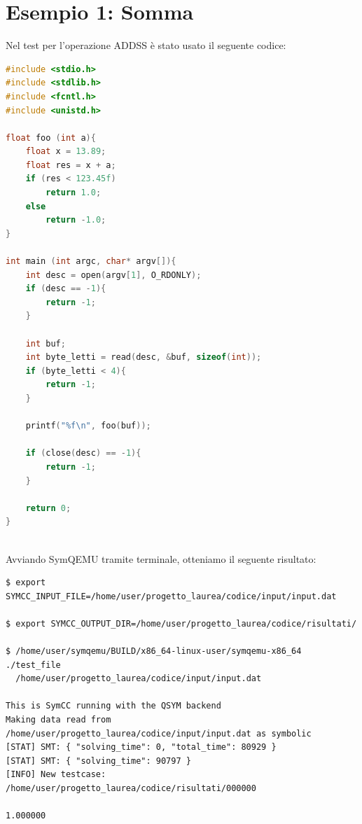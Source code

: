 \documentclass[Lau, oneside]{sapthesis}%
\begin{document}
\section{Esempio 1: Somma}
Nel test per l'operazione ADDSS è stato usato il seguente codice:
\newline
\begin{lstlisting}[xleftmargin=0\textwidth, language=C, basicstyle=\small]
#include <stdio.h>
#include <stdlib.h>
#include <fcntl.h>
#include <unistd.h>

float foo (int a){
    float x = 13.89;
    float res = x + a;
    if (res < 123.45f)
        return 1.0;
    else 
        return -1.0;
}

int main (int argc, char* argv[]){
    int desc = open(argv[1], O_RDONLY);
    if (desc == -1){
        return -1;
    }

    int buf;
    int byte_letti = read(desc, &buf, sizeof(int));
    if (byte_letti < 4){
        return -1;
    }

    printf("%f\n", foo(buf));

    if (close(desc) == -1){
        return -1;
    }

    return 0;
}
\end{lstlisting}
\ \\ \newline
Avviando SymQEMU tramite terminale, otteniamo il seguente risultato:
\begin{lstlisting}[xleftmargin=0\textwidth, basicstyle=\footnotesize]
$ export SYMCC_INPUT_FILE=/home/user/progetto_laurea/codice/input/input.dat

$ export SYMCC_OUTPUT_DIR=/home/user/progetto_laurea/codice/risultati/

$ /home/user/symqemu/BUILD/x86_64-linux-user/symqemu-x86_64  ./test_file 
  /home/user/progetto_laurea/codice/input/input.dat

This is SymCC running with the QSYM backend
Making data read from /home/user/progetto_laurea/codice/input/input.dat as symbolic
[STAT] SMT: { "solving_time": 0, "total_time": 80929 }
[STAT] SMT: { "solving_time": 90797 }
[INFO] New testcase: /home/user/progetto_laurea/codice/risultati/000000

1.000000
\end{lstlisting}
\end{document}
